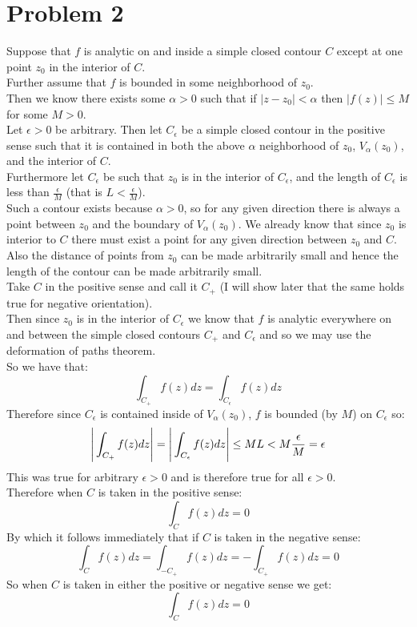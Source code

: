 \documentclass{article}
\begin{document}
\section*{Problem 2}
\begin{center}
    \doublespacing
    Suppose that $f$ is analytic on and inside a simple closed contour $C$ except at one point $z_0$ in the interior of $C$.
    \\Further assume that $f$ is bounded in some neighborhood of $z_0$.
    \\Then we know there exists some $\alpha > 0$ such that if $|z - z_0| <\alpha$ then $|f(z)|\leq M$ for some $M > 0$.
    \break
    \\Let $\epsilon > 0$ be arbitrary. Then let $C_{\epsilon}$ be a simple closed contour in the positive sense such that it is contained in both the above $\alpha$ neighborhood of $z_0$, $V_{\alpha} (z_0)$, and the interior of $C$.
    \\Furthermore let $C_{\epsilon}$ be such that $z_0$ is in the interior of $C_{\epsilon}$, and the length of $C_{\epsilon}$ is less than $\frac{\epsilon}{M}$ (that is $L <\frac{\epsilon}{M}$).
    \\Such a contour exists because $\alpha > 0$, so for any given direction there is always a point between $z_0$ and the boundary of $V_{\alpha} (z_0)$. We already know that since $z_0$ is interior to $C$ there must exist a point for any given direction between $z_0$ and $C$.
    \\Also the distance of points from $z_0$ can be made arbitrarily small and hence the length of the contour can be made arbitrarily small.
    \\Take $C$ in the positive sense and call it $C_+$ (I will show later that the same holds true for negative orientation).
    \\Then since $z_0$ is in the interior of $C_{\epsilon}$ we know that $f$ is analytic everywhere on and between the simple closed contours $C_+$ and $C_{\epsilon}$ and so we may use the deformation of paths theorem.
    \\So we have that:
    \[\int _{C_+} f(z) dz =\int _{C_{\epsilon}} f(z) dz\]
    Therefore since $C_{\epsilon}$ is contained inside of $V_{\alpha} (z_0)$, $f$ is bounded (by $M$) on $C_{\epsilon}$ so:
    \[\Bigg{|}\int _{C_+} f(z) dz\Bigg{|} =\Bigg{|}\int _{C_{\epsilon}} f(z) dz\Bigg{|}\leq ML < M\frac{\epsilon}{M} =\epsilon\]
    This was true for arbitrary $\epsilon > 0$ and is therefore true for all $\epsilon > 0$.
    \\Therefore when $C$ is taken in the positive sense:
    \[\int _C f(z) dz = 0\]
    By which it follows immediately that if $C$ is taken in the negative sense:
    \[\int _C f(z) dz =\int _{-C_+} f(z) dz = -\int _{C_+} f(z) dz = 0\]
    So when $C$ is taken in either the positive or negative sense we get:
    \[\int _C f(z) dz = 0\]
    \qedsymbol
\end{center}
\end{document}
